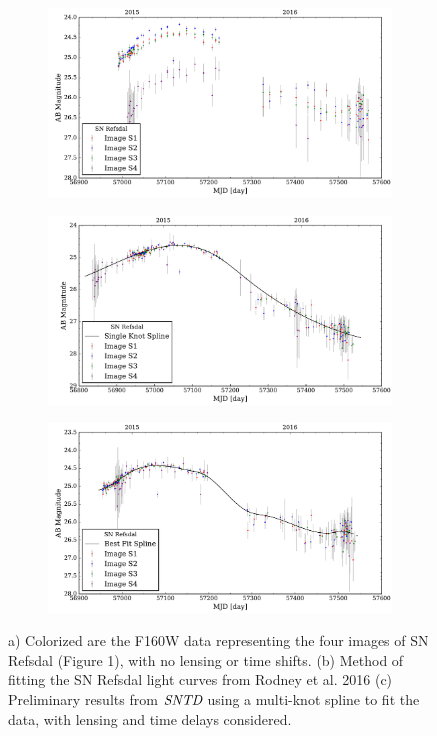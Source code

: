 \begin{figure}
\centering
\begin{subfigure}{.42\textwidth}
\centering
\includegraphics[width=.96\textwidth]{points_plot_2017.pdf}
        \caption{}\label{fig:fig_a}
\end{subfigure}
\begin{subfigure}{.42\textwidth}
\centering
\includegraphics[width=.96\textwidth]{ref_plot_2017.pdf}
\caption{}\label{fig:fig_b}
\end{subfigure}
\begin{subfigure}{.42\textwidth}
\centering
\vspace{0pt}
\includegraphics[width=.96\textwidth]{gra_plot_2017.pdf}
\caption{}\label{fig:fig_c}
\end{subfigure}
\caption{a) Colorized are the F160W data representing the four images of SN Refsdal (Figure 1), with no lensing or time shifts. (b) Method of fitting the SN Refsdal light curves from Rodney et al. 2016 (c) Preliminary results from $\textit{SNTD}$ using a multi-knot spline to fit the data, with lensing and time delays considered. }
\end{figure}


